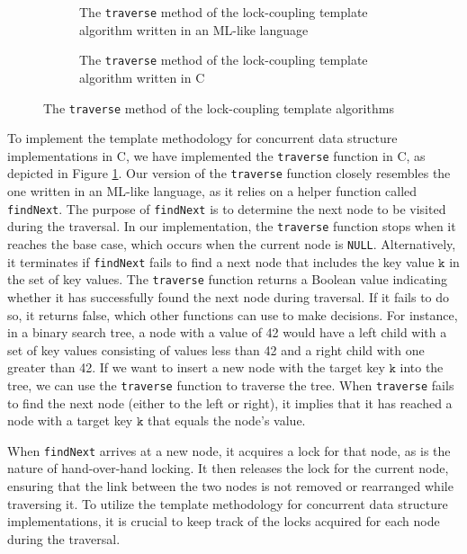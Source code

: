 \documentclass[a4paper,UKenglish,cleveref, autoref, thm-restate]{lipics-v2021}
\begin{document}
\begin{figure}[ht]
	\begin{subfigure}[t]{0.45\textwidth}
		 
		\caption{The \lstinline{traverse} method of the lock-coupling template algorithm written in an ML-like language \cite{krishna2019compositional}} 
		\label{traverse_lock_a}	
	\end{subfigure}\qquad
	\begin{subfigure}[t]{0.48\textwidth}
		 
		\caption{The \lstinline{traverse} method of the lock-coupling template algorithm written in C}
		\label{traverse_lock_b}
	\end{subfigure}
	\caption{The \lstinline{traverse} method of the lock-coupling template algorithms}
	\label{traverse_lock}
\end{figure}

To implement the template methodology for concurrent data structure implementations in C, we have implemented the \lstinline{traverse} function in C, as depicted in Figure \ref{traverse_lock_a}.  Our version of the \lstinline{traverse} function closely resembles the one written in an ML-like language, as it relies on a helper function called \lstinline{findNext}. The purpose of \lstinline{findNext} is to determine the next node to be visited during the traversal. In our implementation, the \lstinline{traverse} function stops when it reaches the base case, which occurs when the current node is \lstinline{NULL}. Alternatively, it terminates if \lstinline{findNext} fails to find a next node that includes the key value $\texttt{k}$ in the set of key values. The \lstinline{traverse} function returns a Boolean value indicating whether it has successfully found the next node during traversal. If it fails to do so, it returns false, which other functions can use to make decisions. For instance, in a binary search tree, a node with a value of 42 would have a left child with a set of key values consisting of values less than 42 and a right child with one greater than 42. If we want to insert a new node with the target key $\texttt{k}$ into the tree, we can use the \lstinline{traverse} function to traverse the tree. When \lstinline{traverse} fails to find the next node (either to the left or right), it implies that it has reached a node with a target key $\texttt{k}$ that equals the node's value. 

When \lstinline{findNext} arrives at a new node, it acquires a lock for that node, as is the nature of hand-over-hand locking. It then releases the lock for the current node, ensuring that the link between the two nodes is not removed or rearranged while traversing it. To utilize the template methodology for concurrent data structure implementations, it is crucial to keep track of the locks acquired for each node during the traversal. 
\end{document}
